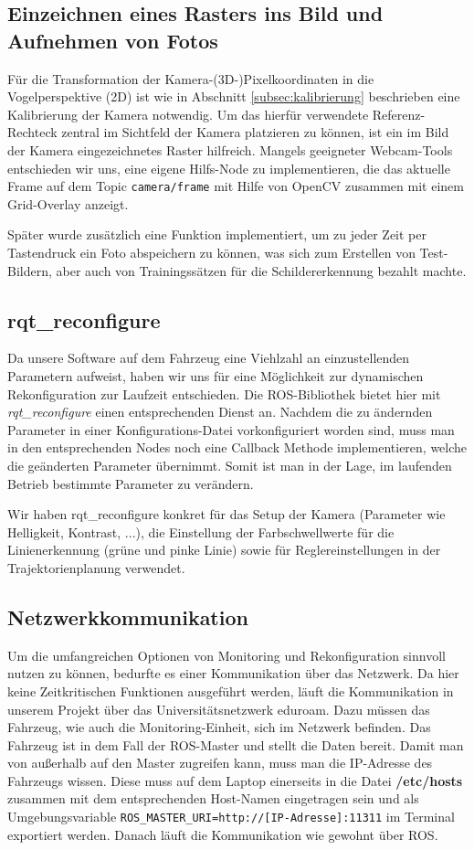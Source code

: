\subsection{Einzeichnen eines Rasters ins Bild und Aufnehmen von Fotos}
F\"ur die Transformation der Kamera-(3D-)Pixelkoordinaten in die Vogelperspektive (2D) ist wie in Abschnitt \ref{subsec:kalibrierung} beschrieben eine Kalibrierung der Kamera notwendig.
Um das hierf\"ur verwendete Referenz-Rechteck zentral im Sichtfeld der Kamera
platzieren zu k\"onnen, ist ein im Bild der Kamera eingezeichnetes Raster hilfreich.
Mangels geeigneter Webcam-Tools entschieden wir uns, eine eigene Hilfs-Node
zu implementieren, die das aktuelle Frame auf dem Topic
\texttt{camera/frame} mit Hilfe von OpenCV
zusammen mit einem Grid-Overlay anzeigt.

Sp\"ater wurde zus\"atzlich eine Funktion implementiert, um zu jeder Zeit per
Tastendruck ein Foto abspeichern zu k\"onnen, was sich zum Erstellen von Test-Bildern,
aber auch von Trainingss\"atzen f\"ur die Schildererkennung bezahlt machte.

\subsection{rqt\_reconfigure}
Da unsere Software auf dem Fahrzeug eine Viehlzahl an einzustellenden Parametern aufweist, haben wir uns f\"ur eine M\"oglichkeit zur dynamischen Rekonfiguration zur Laufzeit entschieden. Die ROS-Bibliothek bietet hier mit \textit{rqt\_reconfigure}\cite{reconfigure} einen entsprechenden Dienst an. Nachdem die zu \"andernden Parameter in einer Konfigurations-Datei vorkonfiguriert worden sind, muss man in den entsprechenden Nodes noch eine Callback Methode implementieren, welche die ge\"anderten Parameter \"ubernimmt. Somit ist man in der Lage, im laufenden Betrieb bestimmte Parameter zu ver\"andern.

Wir haben rqt\_reconfigure konkret f\"ur das Setup der Kamera (Parameter wie Helligkeit, Kontrast, ...), die Einstellung der Farbschwellwerte f\"ur die Linienerkennung (gr\"une und pinke Linie) sowie f\"ur Reglereinstellungen in der Trajektorienplanung verwendet.

\subsection{Netzwerkkommunikation}
Um die umfangreichen Optionen von Monitoring und Rekonfiguration sinnvoll nutzen zu k\"onnen, bedurfte es einer Kommunikation \"uber das Netzwerk. Da hier keine Zeitkritischen Funktionen ausgef\"uhrt werden, l\"auft die Kommunikation in unserem Projekt \"uber das Universit\"atsnetzwerk eduroam. Dazu m\"ussen das Fahrzeug, wie auch die Monitoring-Einheit, sich im Netzwerk befinden. Das Fahrzeug ist in dem Fall der ROS-Master und stellt die Daten bereit. Damit man von au\ss erhalb auf den Master zugreifen kann, muss man die IP-Adresse des Fahrzeugs wissen. Diese muss auf dem Laptop einerseits in die Datei \textbf{/etc/hosts} zusammen mit dem entsprechenden Host-Namen eingetragen sein und als Umgebungsvariable \texttt{ROS\_MASTER\_URI=http://[IP-Adresse]:11311} im Terminal exportiert werden. Danach l\"auft die Kommunikation wie gewohnt \"uber ROS.

